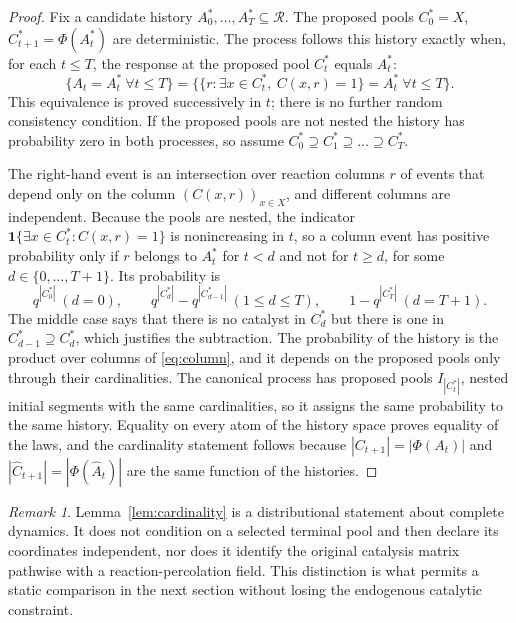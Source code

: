 \documentclass[11pt,reqno]{amsart}
\theoremstyle{plain}
\theoremstyle{definition}
\theoremstyle{remark}
\newtheorem{remark}[theorem]{Remark}
\numberwithin{equation}{section}
\newcommand{\cR}{\mathcal{R}}
\begin{document}
\begin{proof}
Fix a candidate history $A_0^*,\dots,A_T^*\subseteq\cR$. The proposed pools $C_0^*=X$, $C_{t+1}^*=\Phi(A_t^*)$ are deterministic. The process follows this history exactly when, for each $t\le T$, the response at the proposed pool $C_t^*$ equals $A_t^*$:
\[
\{A_t=A_t^*\ \forall t\le T\}=\bigl\{\{r:\exists x\in C_t^*,\ C(x,r)=1\}=A_t^*\ \forall t\le T\bigr\}.
\]
This equivalence is proved successively in $t$; there is no further random consistency condition. If the proposed pools are not nested the history has probability zero in both processes, so assume $C_0^*\supseteq C_1^*\supseteq\dots\supseteq C_T^*$.

The right-hand event is an intersection over reaction columns $r$ of events that depend only on the column $(C(x,r))_{x\in X}$, and different columns are independent. Because the pools are nested, the indicator $\mathbf 1\{\exists x\in C_t^*: C(x,r)=1\}$ is nonincreasing in $t$, so a column event has positive probability only if $r$ belongs to $A_t^*$ for $t<d$ and not for $t\ge d$, for some $d\in\{0,\dots,T+1\}$. Its probability is
\begin{equation}\label{eq:column}
q^{|C_0^*|}\ (d=0),\qquad q^{|C_d^*|}-q^{|C_{d-1}^*|}\ (1\le d\le T),\qquad 1-q^{|C_T^*|}\ (d=T+1).
\end{equation}
The middle case says that there is no catalyst in $C_d^*$ but there is one in $C_{d-1}^*\supseteq C_d^*$, which justifies the subtraction. The probability of the history is the product over columns of \eqref{eq:column}, and it depends on the proposed pools only through their cardinalities. The canonical process has proposed pools $I_{|C_t^*|}$, nested initial segments with the same cardinalities, so it assigns the same probability to the same history. Equality on every atom of the history space proves equality of the laws, and the cardinality statement follows because $|C_{t+1}|=|\Phi(A_t)|$ and $|\widehat C_{t+1}|=|\Phi(\widehat A_t)|$ are the same function of the histories.
\end{proof}

\begin{remark}
Lemma~\ref{lem:cardinality} is a distributional statement about complete dynamics. It does not condition on a selected terminal pool and then declare its coordinates independent, nor does it identify the original catalysis matrix pathwise with a reaction-percolation field. This distinction is what permits a static comparison in the next section without losing the endogenous catalytic constraint.
\end{remark}
\end{document}

